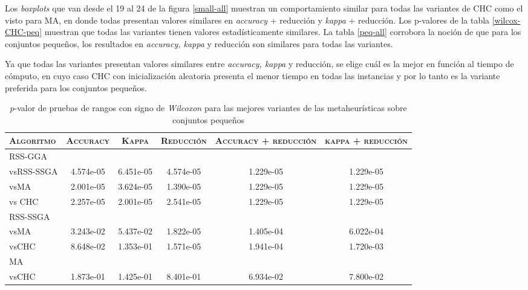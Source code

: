 Los \emph{boxplots} que van desde el 19 al 24 de la figura \ref{small-all} muestran un comportamiento similar para todas las variantes de CHC como el visto para MA, en donde todas presentan valores similares en \emph{accuracy} + reducción y \emph{kappa} + reducción. Los p-valores de la tabla \ref{wilcox-CHC-peq} muestran que todas las variantes tienen valores estadísticamente similares. La tabla \ref{peq-all} corrobora la noción de que para los conjuntos pequeños, los resultados en \emph{accuracy, kappa} y reducción son similares para todas las variantes.

Ya que todas las variantes  presentan valores similares entre \emph{accuracy, kappa} y reducción, se elige cuál es la mejor en función al tiempo de cómputo, en cuyo caso CHC con inicialización aleatoria presenta el menor tiempo en todas las instancias y por lo tanto es la variante preferida para los conjuntos pequeños.

\begin{table}[h!]
\centering
\begin{adjustbox}{max width =\textwidth}
\begin{tabular}{l c c c c c}
\hline
	\textsc{Algoritmo}
	& \multicolumn{1}{c}{\textsc{Accuracy}}
	& \multicolumn{1}{c}{\textsc{Kappa}}
	& \multicolumn{1}{c}{\textsc{Reducción}} 
	& \multicolumn{1}{c}{\textsc{Accuracy + reducción}} 
	& \multicolumn{1}{c}{\textsc{kappa + reducción}} \\
\hline
\hline

RSS-GGA\\
vsRSS-SSGA & 4.574e-05 & 6.451e-05 & 4.574e-05 & 1.229e-05 & 1.229e-05 \\
vsMA       & 2.001e-05 & 3.624e-05 & 1.390e-05 & 1.229e-05 & 1.229e-05 \\
vs CHC     & 2.257e-05 & 2.001e-05 & 2.541e-05 & 1.229e-05 & 1.229e-05 \\

\hline 

RSS-SSGA\\
vsMA  & 3.243e-02 & 5.437e-02 & 1.822e-05 & 1.405e-04 & 6.022e-04 \\
vsCHC & 8.648e-02 & 1.353e-01 & 1.571e-05 & 1.941e-04 & 1.720e-03 \\

\hline

MA\\
vsCHC & 1.873e-01 & 1.425e-01 & 8.401e-01 & 6.934e-02 & 7.800e-02 \\

\hline

\end{tabular}
\end{adjustbox}
\caption[Pruebas de \emph{Wilcoxon} entre las mejores variaciones de cada metaheurística para conjuntos pequeños]{$p$-valor de pruebas de rangos con signo de \emph{Wilcoxon} para las mejores variantes de las metaheurísticas sobre conjuntos pequeños}
\label{wilcox-best-peq}
\end{table}

